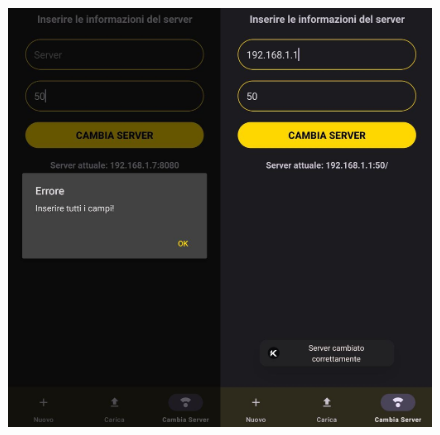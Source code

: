 \begin{enumerate}
  \begin{figure}[H]
    \centering
    \includegraphics[scale=0.35]{img/app11.png}
  \end{figure}
\end{enumerate}